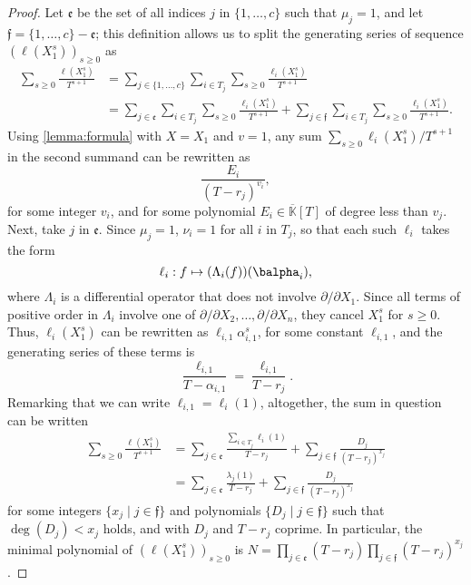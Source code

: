 \documentclass[12pt]{article}
\newcommand{\lf}{X}
\def\Kbar {{\ensuremath{\overline{\mathbb{K}}}}}
\begin{document}
\begin{proof}
	Let $\mathfrak{e}$ be the set of all indices $j$ in $\{1,\dots,c\}$
	such that $\mu_j=1$, and let $\mathfrak{f}=\{1,\dots,c\}-\mathfrak{e}$;
	this definition allows us to split the generating series
        of sequence $(\ell(X_1^s))_{s\ge 0}$ as
	\begin{align*}
	\sum_{s \ge 0} \frac{\ell(X_1^s)}{T^{s+1}  }
	&= \sum_{j \in \{1,\dots,c\}}\sum_{i\in T_j} 
	\sum_{s \ge 0} \frac{\ell_i(X_1^s)}{T^{s+1}}  \\
	&=\sum_{j \in \mathfrak{e}}\sum_{i\in T_j}\sum_{s \ge 0}  \frac{\ell_i(X_1^s)}{T^{s+1}} +
	\sum_{j \in \mathfrak{f}}\sum_{i\in T_j}\sum_{s \ge 0}  \frac{\ell_i(X_1^s)}{T^{s+1}}.
	\end{align*}
	Using \cref{lemma:formula} with $\lf=X_1$ and $v=1$, any sum $\sum_{s \ge 0} \ell_i(X_1^s)/T^{s+1}$ 
	in the second summand
	can be rewritten as 
	$$\frac{E_i}{(T-r_j)^{v_i}},$$
	for some integer $v_i$, and for some polynomial $E_i \in \Kbar[T]$ of degree less than
	$v_j$. Next, take $j$ in $\mathfrak{e}$. Since $\mu_j=1$, $\nu_i=1$ for all $i$ in $T_j$,
	so that
	each such $\ell_i$ takes the form 
	$$\ell_i: f \mapsto (\Lambda_{i}(f))(\balpha_i),$$ where $\Lambda_{i}$
	is a differential operator that does not involve $\partial/\partial
	X_1$. Since all terms of positive order in $\Lambda_i$ involve one of
	$\partial/\partial X_2,\dots,\partial/\partial X_n$, they cancel
	$X_1^s$ for $s\ge 0$. Thus, $\ell_i(X_1^s)$ can be rewritten 
	as $\ell_{i,1} \alpha_{i,1}^s$, for some constant $\ell_{i,1}$,
	and the generating series of these terms is 
	$$\frac {\ell_{i,1}}{T-\alpha_{i,1}}=\frac {\ell_{i,1}}{T-r_j}.$$
	Remarking  that we can write $\ell_{i,1}=\ell_i(1)$,
	altogether, the sum in question can be written
	\begin{align*}
	\sum_{s \ge 0} \frac{\ell(X_1^s)}{T^{s+1}  }
	&=\sum_{j \in \mathfrak{e}} 
	\frac{ \sum_{i\in T_j}  \ell_{i}(1) }{T-r_j }
	+ \sum_{j \in \mathfrak{f}} \frac{D_j}{(T-r_j )^{x_j}}\\
	&= \sum_{j \in \mathfrak{e}} 
	\frac{ \lambda_j(1) }{T-r_j }
	+ \sum_{j \in \mathfrak{f}} \frac{D_j}{(T-r_j )^{x_j}}
	\end{align*}
	for some integers $\{x_j \mid j \in \mathfrak{f}\}$ and
        polynomials $\{D_j \mid j \in \mathfrak{f}\}$ such that
        $\deg(D_j) < x_j$ holds, and with $D_j$ and $T-r_j $
        coprime. In particular, the minimal polynomial of  $(\ell(X_1^s))_{s\ge 0}$ is $N=\prod_{j\in
          \mathfrak{e}}(T-r_j) \prod_{j \in  \mathfrak{f}}(T-r_j)^{x_j}$.
	

\end{proof}
\end{document}
